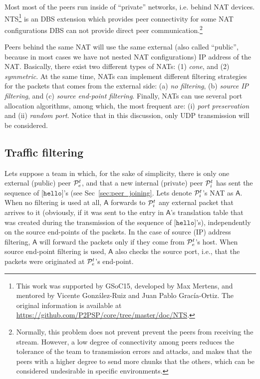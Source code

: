 
Most most of the peers run inside of ``private'' networks, i.e. behind
NAT devices. NTS\footnote{This work was supported by GSoC15, developed
  by Max Mertens, and mentored by Vicente González-Ruiz and Juan Pablo
  Gracía-Ortiz. The original information is available at
  \url{https://github.com/P2PSP/core/tree/master/doc/NTS}.} is an DBS
extension which provides peer connectivity for some NAT configurations
DBS can not provide direct peer communication.\footnote{Normally, this
  problem does not prevent prevent the peers from receiving the
  stream. However, a low degree of connectivity among peers reduces
  the tolerance of the team to transmission errors and attacks, and
  makes that the peers with a higher degree to send more chunks that
  the others, which can be considered undesirable in specific
  environments.}

Peers behind the same NAT will use the same external (also called
``public'', because in most cases we have not nested NAT
configurations) IP address of the NAT. Basically, there exist two
different types of NATs: (1) \emph{cone}, and (2) \emph{symmetric}. At
the same time, NATs can implement different filtering strategies for
the packets that comes from the external side: (a) \emph{no
  filtering}, (b) \emph{source IP filtering}, and (c) \emph{source
  end-point filtering}. Finally, NATs can use several port allocation
algorithms, among which, the most frequent are: (i) \emph{port
  preservation} and (ii) \emph{random port}. Notice that in this
discussion, only UDP transmission will be considered.

\subsection{Traffic filtering}
Lets suppose a team in which, for the sake of simplicity, there is
only one external (public) peer ${\cal P}^t_e$, and that a new
internal (private) peer ${\cal P}^t_i$ has sent the sequence of
[$\mathtt{hello}$]'s (see Sec~\ref{sec:peer_joining}. Lets denote
${\cal P}^t_i$'s NAT as $\mathsf{A}$. When no filtering is used at
all, $\mathsf{A}$ forwards to ${\cal P}^t_i$ any external packet that
arrives to it (obviously, if it was sent to the entry in
$\mathsf{A}$'s translation table that was created during the
transmission of the sequence of [$\mathtt{hello}$]'s), independently
on the source end-points of the packets. In the case of source (IP)
address filtering, $\mathsf{A}$ will forward the packets only if they
come from ${\cal P}^t_e$'s host.  When source end-point filtering is
used, $\mathsf{A}$ also checks the source port, i.e., that the packets
were originated at ${\cal P}^t_e$'s end-point.


